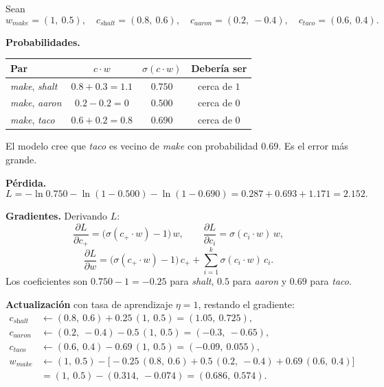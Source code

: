 \documentclass[11pt,letterpaper]{article}
\begin{document}
\begin{ejemplo}
    Sean
    \[
        w_{\textit{make}} = (1,\ 0.5) , \quad
        c_{\textit{shalt}} = (0.8,\ 0.6) , \quad
        c_{\textit{aaron}} = (0.2,\ -0.4) , \quad
        c_{\textit{taco}} = (0.6,\ 0.4) .
    \]

    \textbf{Probabilidades.}
    \begin{center}
    \begin{tabular}{lccc}
        \toprule
        \textbf{Par} & $c \cdot w$ & $\sigma(c \cdot w)$
            & \textbf{Debería ser} \\
        \midrule
        \textit{make}, \textit{shalt} & $0.8 + 0.3 = 1.1$
            & $0.750$ & cerca de $1$ \\
        \textit{make}, \textit{aaron} & $0.2 - 0.2 = 0$
            & $0.500$ & cerca de $0$ \\
        \textit{make}, \textit{taco}  & $0.6 + 0.2 = 0.8$
            & $0.690$ & cerca de $0$ \\
        \bottomrule
    \end{tabular}
    \end{center}
    El modelo cree que \textit{taco} es vecino de \textit{make} con
    probabilidad $0.69$. Es el error más grande.

    \textbf{Pérdida.}
    \[
        L = -\ln 0.750 - \ln (1 - 0.500) - \ln (1 - 0.690)
          = 0.287 + 0.693 + 1.171 = 2.152 .
    \]

    \textbf{Gradientes.} Derivando $L$:
    \[
        \frac{\partial L}{\partial c_{+}}
            = \big(\sigma(c_{+} \cdot w) - 1\big)\, w ,
        \qquad
        \frac{\partial L}{\partial c_{i}}
            = \sigma(c_{i} \cdot w)\, w ,
    \]
    \[
        \frac{\partial L}{\partial w}
            = \big(\sigma(c_{+} \cdot w) - 1\big)\, c_{+}
            + \sum_{i=1}^{k} \sigma(c_{i} \cdot w)\, c_{i} .
    \]
    Los coeficientes son $0.750 - 1 = -0.25$ para \textit{shalt},
    $0.5$ para \textit{aaron} y $0.69$ para \textit{taco}.

    \textbf{Actualización} con tasa de aprendizaje $\eta = 1$, restando
    el gradiente:
    \begin{align*}
        c_{\textit{shalt}} &\leftarrow (0.8,\ 0.6) + 0.25\,(1,\ 0.5)
            = (1.05,\ 0.725) , \\
        c_{\textit{aaron}} &\leftarrow (0.2,\ -0.4) - 0.5\,(1,\ 0.5)
            = (-0.3,\ -0.65) , \\
        c_{\textit{taco}} &\leftarrow (0.6,\ 0.4) - 0.69\,(1,\ 0.5)
            = (-0.09,\ 0.055) , \\
        w_{\textit{make}} &\leftarrow (1,\ 0.5)
            - \big[ -0.25\,(0.8,\ 0.6) + 0.5\,(0.2,\ -0.4)
                    + 0.69\,(0.6,\ 0.4) \big] \\
            &= (1,\ 0.5) - (0.314,\ -0.074) = (0.686,\ 0.574) .
    \end{align*}


\end{ejemplo}
\end{document}
